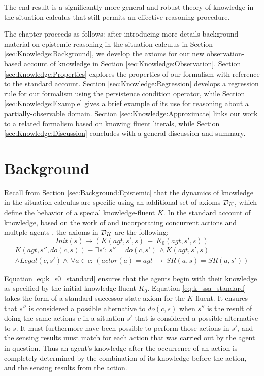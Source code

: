 The end result is a significantly more general and robust theory of
knowledge in the situation calculus that still permits an effective
reasoning procedure.

The chapter proceeds as follows: after introducing more details background
material on epistemic reasoning in the situation calculus in Section
\ref{sec:Knowledge:Background}, we develop the axioms for our new
observation-based account of knowledge in Section \ref{sec:Knowledge:Observation}.
Section \ref{sec:Knowledge:Properties} explores the properties of
our formalism with reference to the standard account. Section \ref{sec:Knowledge:Regression}
develops a regression rule for our formalism using the persistence
condition operator, while Section \ref{sec:Knowledge:Example} gives
a brief example of its use for reasoning about a partially-observable
domain. Section \ref{sec:Knowledge:Approximate} links our work to
a related formalism based on knowing fluent literals, while Section
\ref{sec:Knowledge:Discussion} concludes with a general discussion
and summary.


\section{Background\label{sec:Knowledge:Background}}

Recall from Section \ref{sec:Background:Epistemic} that the dynamics
of knowledge in the situation calculus are specific using an additional
set of axioms $\mathcal{D}_{K}$, which define the behavior of a special knowledge-fluent
$K$. In the standard account of knowledge, based on the work of \citet{scherl03sc_knowledge}
and incorporating concurrent actions and multple agents \citep{shapiro98specifying_ma_systems,scherl03conc_knowledge},
the axioms in $\mathcal{D}_{K}$ are the following:\begin{equation}
Init(s)\rightarrow\left(K(agt,s',s)\,\equiv\, K_{0}(agt,s',s)\right)\label{eq:k_s0_standard}\end{equation}
 \begin{multline}
K(agt,s'',do(c,s))\equiv\exists s':\, s''=do(c,s')\,\wedge K(agt,s',s)\\
\wedge Legal(c,s')\wedge\,\forall a\in c:\,\left(actor(a)=agt\,\rightarrow\, SR(a,s)=SR(a,s')\right)\label{eq:k_ssa_standard}\end{multline}


Equation \eqref{eq:k_s0_standard} ensures that the agents begin with
their knowledge as specified by the initial knowledge fluent $K_{0}$.
Equation \eqref{eq:k_ssa_standard} takes the form of a standard successor
state axiom for the $K$ fluent. It ensures that $s''$ is considered
a possible alternative to $do(c,s)$ when $s''$ is the result of
doing the same actions $c$ in a situation $s'$ that is considered
a possible alternative to $s$. It must furthermore have been possible
to perform those actions in $s'$, and the sensing results must match
for each action that was carried out by the agent in question. Thus
an agent's knowledge after the occurrence of an action is completely
determined by the combination of its knowledge before the action,
and the sensing results from the action.

